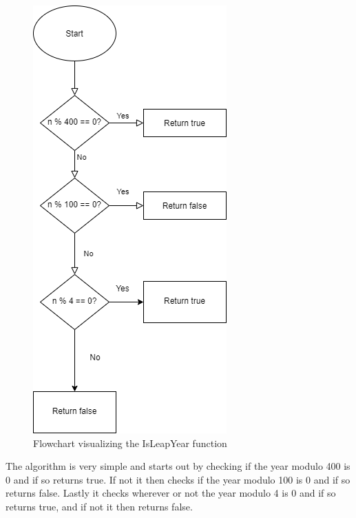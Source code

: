\documentclass{article}
\begin{document}
\begin{figure}[h!]
    \centering
    \includegraphics{IsLeapYear_FlowChart.drawio.png}
    \caption[width=0.5]{Flowchart visualizing the IsLeapYear function}
    \label{fig:my_label}
\end{figure}

The algorithm is very simple and starts out by checking if the year modulo 400 is 0 and if so returns true. If not it then checks if the year modulo 100 is 0 and if so returns false. Lastly it checks wherever or not the year modulo 4 is 0 and if so returns true, and if not it then returns false. 
\end{document}
